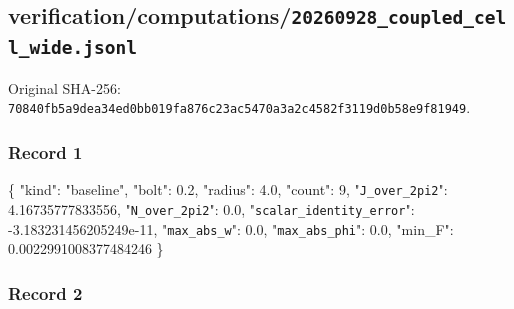 \documentclass[
  10pt,
]{article}
\newenvironment{Shaded}{}{}
\newcommand{\DataTypeTok}[1]{\textcolor[rgb]{0.56,0.13,0.00}{#1}}
\newcommand{\DecValTok}[1]{\textcolor[rgb]{0.25,0.63,0.44}{#1}}
\newcommand{\FloatTok}[1]{\textcolor[rgb]{0.25,0.63,0.44}{#1}}
\newcommand{\FunctionTok}[1]{\textcolor[rgb]{0.02,0.16,0.49}{#1}}
\newcommand{\StringTok}[1]{\textcolor[rgb]{0.25,0.44,0.63}{#1}}
\begin{document}
\hypertarget{verificationcomputations20260928_coupled_cell_wide.jsonl}{%
\subsection{verification/computations/\nolinkurl{20260928_coupled_cell_wide.jsonl}}\label{verificationcomputations20260928_coupled_cell_wide.jsonl}}

Original SHA-256:
\nolinkurl{70840fb5a9dea34ed0bb019fa876c23ac5470a3a2c4582f3119d0b58e9f81949}.

\hypertarget{record-1-1}{%
\subsubsection{Record 1}\label{record-1-1}}

\begin{Shaded}
\begin{Highlighting}[]
\FunctionTok{\{}
  \DataTypeTok{"kind"}\FunctionTok{:} \StringTok{"baseline"}\FunctionTok{,}
  \DataTypeTok{"bolt"}\FunctionTok{:} \FloatTok{0.2}\FunctionTok{,}
  \DataTypeTok{"radius"}\FunctionTok{:} \FloatTok{4.0}\FunctionTok{,}
  \DataTypeTok{"count"}\FunctionTok{:} \DecValTok{9}\FunctionTok{,}
  \DataTypeTok{"\nolinkurl{J_over_2pi2}"}\FunctionTok{:} \FloatTok{4.16735777833556}\FunctionTok{,}
  \DataTypeTok{"\nolinkurl{N_over_2pi2}"}\FunctionTok{:} \FloatTok{0.0}\FunctionTok{,}
  \DataTypeTok{"\nolinkurl{scalar_identity_error}"}\FunctionTok{:} \FloatTok{{-}3.183231456205249e{-}11}\FunctionTok{,}
  \DataTypeTok{"\nolinkurl{max_abs_w}"}\FunctionTok{:} \FloatTok{0.0}\FunctionTok{,}
  \DataTypeTok{"\nolinkurl{max_abs_phi}"}\FunctionTok{:} \FloatTok{0.0}\FunctionTok{,}
  \DataTypeTok{"min\_F"}\FunctionTok{:} \FloatTok{0.0022991008377484246}
\FunctionTok{\}}
\end{Highlighting}
\end{Shaded}

\hypertarget{record-2-1}{%
\subsubsection{Record 2}\label{record-2-1}}
\end{document}
